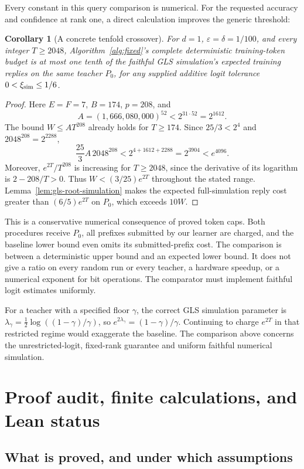 \documentclass[11pt]{article}
\newtheorem{corollary}[theorem]{Corollary}
\theoremstyle{definition}
\theoremstyle{remark}
\begin{document}
Every constant in this query comparison is numerical. For the requested accuracy and confidence at rank one, a direct calculation improves the generic threshold:
\begin{corollary}[A concrete tenfold crossover]\label{cor:tenfold2048}
For $d=1$, $\varepsilon=\delta=1/100$, and every integer $T\ge2048$, Algorithm~\ref{alg:fixed}'s complete deterministic training-token budget is at most one tenth of the faithful GLS simulation's expected training replies on the same teacher $P_0$, for any supplied additive logit tolerance $0<\xi_{\rm sim}\le1/6$.
\end{corollary}
\begin{proof}
Here $E=F=7$, $B=174$, $p=208$, and
\[
A=(1{,}666{,}080{,}000)^{52}<2^{31\cdot52}=2^{1612}.
\]
The bound $W\le AT^{208}$ already holds for $T\ge174$. Since $25/3<2^4$ and $2048^{208}=2^{2288}$,
\[
\frac{25}{3}A\,2048^{208}<2^{4+1612+2288}
=2^{3904}<e^{4096}.
\]
Moreover, $e^{2T}/T^{208}$ is increasing for $T\ge2048$, since the derivative of its logarithm is $2-208/T>0$. Thus $W<(3/25)e^{2T}$ throughout the stated range. Lemma~\ref{lem:gls-root-simulation} makes the expected full-simulation reply cost greater than $(6/5)e^{2T}$ on $P_0$, which exceeds $10W$.
\end{proof}

This is a conservative numerical consequence of proved token caps. Both procedures receive $P_0$, all prefixes submitted by our learner are charged, and the baseline lower bound even omits its submitted-prefix cost. The comparison is between a deterministic upper bound and an expected lower bound. It does not give a ratio on every random run or every teacher, a hardware speedup, or a numerical exponent for bit operations. The comparator must implement faithful logit estimates uniformly.

For a teacher with a specified floor $\gamma$, the correct GLS simulation parameter is
$\lambda_\gamma=\tfrac12\log((1-\gamma)/\gamma)$, so
$e^{2\lambda_\gamma}=(1-\gamma)/\gamma$. Continuing to charge $e^{2T}$ in that restricted regime would exaggerate the baseline. The comparison above concerns the unrestricted-logit, fixed-rank guarantee and uniform faithful numerical simulation.


\section{Proof audit, finite calculations, and Lean status}\label{sec:audit}

\subsection{What is proved, and under which assumptions}
\end{document}
